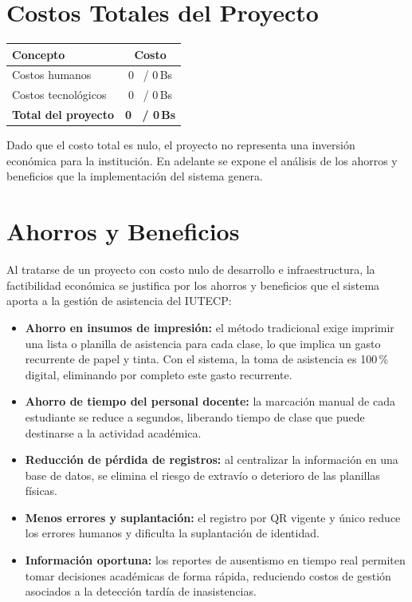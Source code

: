 \documentclass[12pt, letterpaper, oneside]{report}
\begin{document}
\section{Costos Totales del Proyecto}

\begin{center}
\begin{tabularx}{\textwidth}{|X|c|}
\hline
\textbf{Concepto} & \textbf{Costo} \\
\hline
Costos humanos & 0\ \textdollar{} / 0\,Bs \\
\hline
Costos tecnol\'ogicos & 0\ \textdollar{} / 0\,Bs \\
\hline
\textbf{Total del proyecto} & \textbf{0\ \textdollar{} / 0\,Bs} \\
\hline
\end{tabularx}
\end{center}

Dado que el costo total es nulo, el proyecto no representa una inversi\'on econ\'omica para la instituci\'on. En adelante se expone el an\'alisis de los ahorros y beneficios que la implementaci\'on del sistema genera.

\section{Ahorros y Beneficios}

Al tratarse de un proyecto con costo nulo de desarrollo e infraestructura, la factibilidad econ\'omica se justifica por los ahorros y beneficios que el sistema aporta a la gesti\'on de asistencia del IUTECP:

\begin{itemize}
  \item \textbf{Ahorro en insumos de impresi\'on:} el m\'etodo tradicional exige imprimir una lista o planilla de asistencia para cada clase, lo que implica un gasto recurrente de papel y tinta. Con el sistema, la toma de asistencia es 100\,\% digital, eliminando por completo este gasto recurrente.
  \item \textbf{Ahorro de tiempo del personal docente:} la marcaci\'on manual de cada estudiante se reduce a segundos, liberando tiempo de clase que puede destinarse a la actividad acad\'emica.
  \item \textbf{Reducci\'on de p\'erdida de registros:} al centralizar la informaci\'on en una base de datos, se elimina el riesgo de extrav\'io o deterioro de las planillas f\'isicas.
  \item \textbf{Menos errores y suplantaci\'on:} el registro por QR vigente y \'unico reduce los errores humanos y dificulta la suplantaci\'on de identidad.
  \item \textbf{Informaci\'on oportuna:} los reportes de ausentismo en tiempo real permiten tomar decisiones acad\'emicas de forma r\'apida, reduciendo costos de gesti\'on asociados a la detecci\'on tard\'ia de inasistencias.
\end{itemize}
\end{document}
